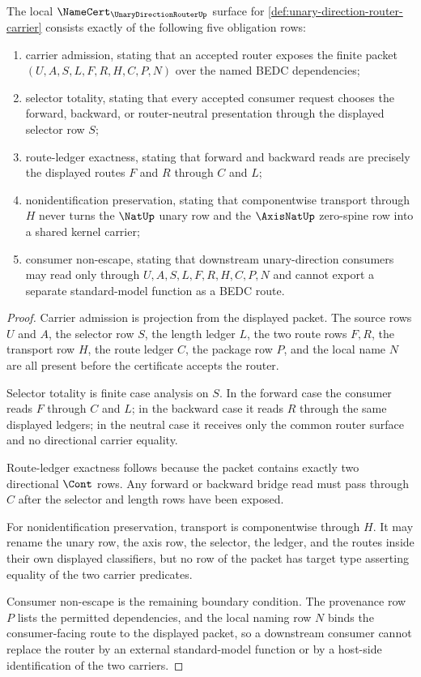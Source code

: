 \begin{theorem}
\label{thm:unary-direction-router-namecert-obligations}
The local $\NameCert_{\UnaryDirectionRouterUp}$ surface for \autoref{def:unary-direction-router-carrier} consists exactly of the following five obligation rows:
\begin{enumerate}
\item carrier admission, stating that an accepted router exposes the finite packet $(U,A,S,L,F,R,H,C,P,N)$ over the named BEDC dependencies;
\item selector totality, stating that every accepted consumer request chooses the forward, backward, or router-neutral presentation through the displayed selector row $S$;
\item route-ledger exactness, stating that forward and backward reads are precisely the displayed routes $F$ and $R$ through $C$ and $L$;
\item nonidentification preservation, stating that componentwise transport through $H$ never turns the $\NatUp$ unary row and the $\AxisNatUp$ zero-spine row into a shared kernel carrier;
\item consumer non-escape, stating that downstream unary-direction consumers may read only through $U,A,S,L,F,R,H,C,P,N$ and cannot export a separate standard-model function as a BEDC route.
\end{enumerate}
\end{theorem}
\begin{proof}
Carrier admission is projection from the displayed packet. The source rows $U$ and $A$, the selector row $S$, the length ledger $L$, the two route rows $F,R$, the transport row $H$, the route ledger $C$, the package row $P$, and the local name $N$ are all present before the certificate accepts the router.

Selector totality is finite case analysis on $S$. In the forward case the consumer reads $F$ through $C$ and $L$; in the backward case it reads $R$ through the same displayed ledgers; in the neutral case it receives only the common router surface and no directional carrier equality.

Route-ledger exactness follows because the packet contains exactly two directional $\Cont$ rows. Any forward or backward bridge read must pass through $C$ after the selector and length rows have been exposed.

For nonidentification preservation, transport is componentwise through $H$. It may rename the unary row, the axis row, the selector, the ledger, and the routes inside their own displayed classifiers, but no row of the packet has target type asserting equality of the two carrier predicates.

Consumer non-escape is the remaining boundary condition. The provenance row $P$ lists the permitted dependencies, and the local naming row $N$ binds the consumer-facing route to the displayed packet, so a downstream consumer cannot replace the router by an external standard-model function or by a host-side identification of the two carriers.
\end{proof}

